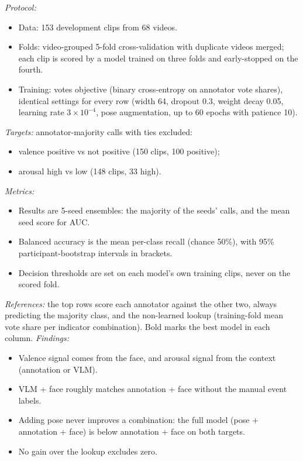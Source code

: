 \documentclass[11pt]{article}
\begin{document}
\begin{table}[!htbp]
{\emph{Protocol:}
\begin{itemize}
  \item Data: 153 development clips from 68 videos.
  \item Folds: video-grouped 5-fold cross-validation with duplicate videos merged; each clip is scored by a model trained on three folds and early-stopped on the fourth.
  \item Training: votes objective (binary cross-entropy on annotator vote shares), identical settings for every row (width 64, dropout 0.3, weight decay 0.05, learning rate $3\times10^{-4}$, pose augmentation, up to 60 epochs with patience 10).
\end{itemize}
\emph{Targets:} annotator-majority calls with ties excluded:
\begin{itemize}
  \item valence positive vs not positive (150 clips, 100 positive);
  \item arousal high vs low (148 clips, 33 high).
\end{itemize}
\emph{Metrics:}
\begin{itemize}
  \item Results are 5-seed ensembles: the majority of the seeds' calls, and the mean seed score for AUC.
  \item Balanced accuracy is the mean per-class recall (chance 50\%), with 95\% participant-bootstrap intervals in brackets.
  \item Decision thresholds are set on each model's own training clips, never on the scored fold.
\end{itemize}
\emph{References:} the top rows score each annotator against the other two, always predicting the majority class, and the non-learned lookup (training-fold mean vote share per indicator combination). Bold marks the best model in each column.
\emph{Findings:}
\begin{itemize}
  \item Valence signal comes from the face, and arousal signal from the context (annotation or VLM).
  \item VLM + face roughly matches annotation + face without the manual event labels.
  \item Adding pose never improves a combination: the full model (pose + annotation + face) is below annotation + face on both targets.
  \item No gain over the lookup excludes zero.
\end{itemize}}
\end{table}
\end{document}
